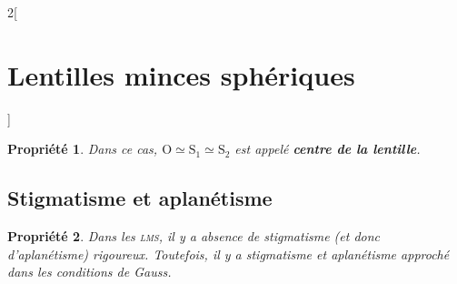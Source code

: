 \documentclass[french]{book}
\newtheorem*{propriete}{Propriété}
\theoremstyle{definition}
\theoremstyle{remark}
\newcommand*{\point}[1]{\mathrm{#1}}
\newcommand*{\tdef}[1]{\textbf{#1}}
\newcommand*{\imp}[1]{\emph{#1}}
\newcommand*{\abr}[1]{\textsc{#1}}
\begin{document}
\begin{landscape}
\begin{multicols*}{2}[\section{Lentilles minces sphériques}]
\begin{propriete}
\noindent Dans ce cas, $\point{O} \simeq \point{S}_1 \simeq \point{S}_2$ est appelé \tdef{centre de la lentille}.

\end{propriete}

\subsection{Stigmatisme et aplanétisme}

\begin{propriete}

Dans les \imp{\abr{lms}}, il y a absence de stigmatisme (et donc d'aplanétisme) rigoureux. Toutefois, il y a stigmatisme et aplanétisme approché dans les \imp{conditions de Gauss}.

\end{propriete}

\end{multicols*}
\end{landscape}
\end{document}
